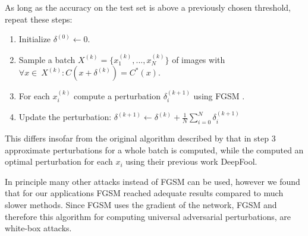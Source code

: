 As long as the accuracy on the test set is above a previously chosen threshold, repeat these steps:
\begin{enumerate}
	\item Initialize $\delta^{(0)} \gets 0$.
	\item Sample a batch $X^{(k)} = \{x_1^{(k)}, ..., x_N^{(k)}\}$ of images with $\forall x \in\ X^{(k)}:  C(x + \delta^{(k)}) = C^*(x)$.
	\item For each $x_i^{(k)}$ compute a perturbation $\delta_i^{(k+1)}$ using FGSM \citep{fgsm}.
	\item Update the perturbation: $\delta^{(k+1)} \gets \delta^{(k)} + \frac{1}{N} \sum\limits_{i=0}^N \delta_i^{(k+1)}$
\end{enumerate}

This differs insofar from the original algorithm described by \citet{universal} that in step 3 approximate perturbations for a whole batch is computed, while the computed an optimal perturbation for each $x_i$ using their previous work DeepFool.

In principle many other attacks instead of FGSM can be used, however we found that for our applications FGSM reached adequate results compared to much slower methods.
Since FGSM uses the gradient of the network, FGSM and therefore this algorithm for computing universal adversarial perturbations, are white-box attacks.
